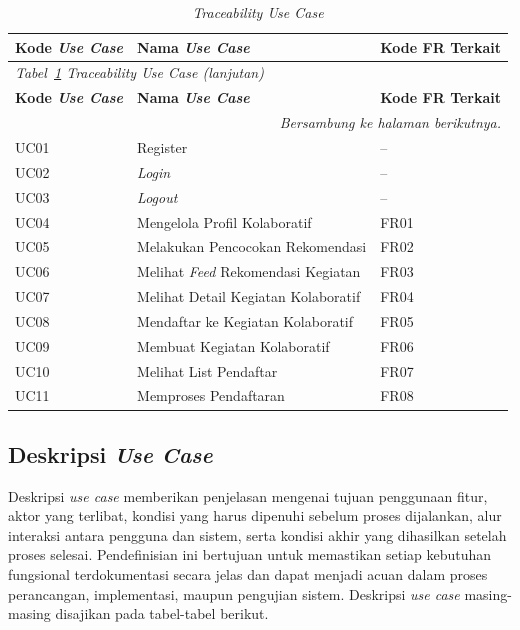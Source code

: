 \begin{longtable}{p{3cm} p{6cm} >{\raggedright\arraybackslash}p{\dimexpr\linewidth-9cm-6\tabcolsep\relax}}
  \caption{\emph{Traceability Use Case}}
  \label{tab:uc-traceability} \\
  \toprule
    \textbf{Kode \emph{Use Case}} & \textbf{Nama \emph{Use Case}} & \textbf{Kode FR Terkait} \\
  \midrule
  \endfirsthead
  \multicolumn{3}{l}{\small\textit{Tabel~\ref{tab:uc-traceability} \emph{Traceability Use Case} (lanjutan)}} \\
  \toprule
    \textbf{Kode \emph{Use Case}} & \textbf{Nama \emph{Use Case}} & \textbf{Kode FR Terkait} \\
  \midrule
  \endhead
  \bottomrule
  \multicolumn{3}{r}{\textit{Bersambung ke halaman berikutnya.}} \\
  \endfoot
  \bottomrule
  \endlastfoot
    UC01 & Register & -- \\
    \midrule
    UC02 & \emph{Login} & -- \\
    \midrule
    UC03 & \emph{Logout} & -- \\
    \midrule
    UC04 & Mengelola Profil Kolaboratif & FR01 \\
    \midrule
    UC05 & Melakukan Pencocokan Rekomendasi & FR02 \\
    \midrule
    UC06 & Melihat \emph{Feed} Rekomendasi Kegiatan & FR03 \\
    \midrule
    UC07 & Melihat Detail Kegiatan Kolaboratif & FR04 \\
    \midrule
    UC08 & Mendaftar ke Kegiatan Kolaboratif & FR05 \\
    \midrule
    UC09 & Membuat Kegiatan Kolaboratif & FR06 \\
    \midrule
    UC10 & Melihat List Pendaftar & FR07 \\
    \midrule
    UC11 & Memproses Pendaftaran & FR08 \\
\end{longtable}

\subsection{Deskripsi \emph{Use Case}}

Deskripsi \emph{use case} memberikan penjelasan mengenai tujuan penggunaan fitur, aktor yang terlibat, kondisi yang harus dipenuhi sebelum proses dijalankan, alur interaksi antara pengguna dan sistem, serta kondisi akhir yang dihasilkan setelah proses selesai. Pendefinisian ini bertujuan untuk memastikan setiap kebutuhan fungsional terdokumentasi secara jelas dan dapat menjadi acuan dalam proses perancangan, implementasi, maupun pengujian sistem. Deskripsi \emph{use case} masing-masing disajikan pada tabel-tabel berikut.

